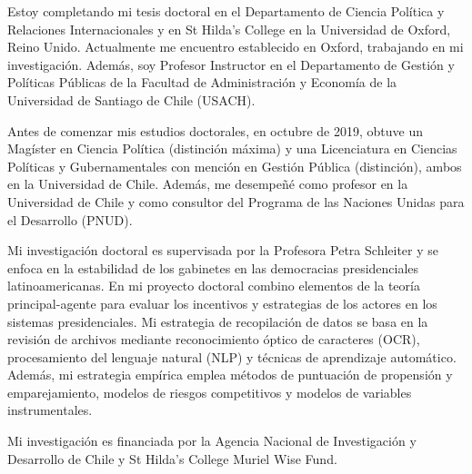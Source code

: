 




\vspace{3mm}

\begin{cvparagraph}

Estoy completando mi tesis doctoral en el Departamento de Ciencia Política y Relaciones Internacionales y en St Hilda’s College en la Universidad de Oxford, Reino Unido. Actualmente me encuentro establecido en Oxford, trabajando en mi investigación. Además, soy Profesor Instructor en el Departamento de Gestión y Políticas Públicas de la Facultad de Administración y Economía de la Universidad de Santiago de Chile (USACH).

Antes de comenzar mis estudios doctorales, en octubre de 2019, obtuve un Magíster en Ciencia Política (distinción máxima) y una Licenciatura en Ciencias Políticas y Gubernamentales con mención en Gestión Pública (distinción), ambos en la Universidad de Chile. Además, me desempeñé como profesor en la Universidad de Chile y como consultor del Programa de las Naciones Unidas para el Desarrollo (PNUD).

Mi investigación doctoral es supervisada por la Profesora Petra Schleiter y se enfoca en la estabilidad de los gabinetes en las democracias presidenciales latinoamericanas. En mi proyecto doctoral combino elementos de la teoría principal-agente para evaluar los incentivos y estrategias de los actores en los sistemas presidenciales. Mi estrategia de recopilación de datos se basa en la revisión de archivos mediante reconocimiento óptico de caracteres (OCR), procesamiento del lenguaje natural (NLP) y técnicas de aprendizaje automático. Además, mi estrategia empírica emplea métodos de puntuación de propensión y emparejamiento, modelos de riesgos competitivos y modelos de variables instrumentales. 

Mi investigación es financiada por la Agencia Nacional de Investigación y Desarrollo de Chile y St Hilda's College Muriel Wise Fund.
\vspace{1mm}
\end{cvparagraph}

